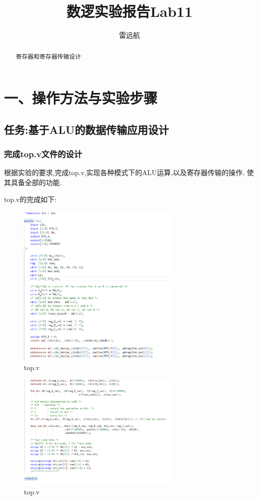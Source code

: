 \documentclass{article}
\title{数逻实验报告Lab11}
\author{雷远航}
\begin{document}
\maketitle

\begin{abstract}
    寄存器和寄存器传输设计
\end{abstract}

\section*{一、操作方法与实验步骤}
\subsection*{任务:基于ALU的数据传输应用设计}
\subsubsection*{完成top.v文件的设计}
根据实验的要求,完成top.v,实现各种模式下的ALU运算,以及寄存器传输的操作,
使其具备全部的功能.

top.v的完成如下:
    \begin{figure}[H]
    \centering
    \includegraphics[width=0.7\textwidth]{1.png}
    \caption{\label{Lab11}top.v}
    \end{figure}


    \begin{figure}[H]
    \centering
    \includegraphics[width=0.7\textwidth]{2.png}
    \caption{\label{Lab11}top.v}
    \end{figure}
\end{document}
